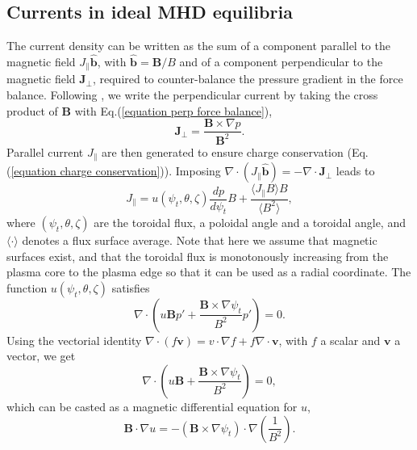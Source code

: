 \documentclass[my_thesis.tex]{subfiles}
\begin{document}
\subsection{Currents in ideal MHD equilibria}\label{sec ideal mhd currents}
The current density can be written as the sum of a component parallel to the magnetic field $J_\parallel \hat{\mathbf{b}}$, with $\hat{\mathbf{b}}=\mathbf{B}/B$ and of a component perpendicular to the magnetic field $\mathbf{J}_\perp$, required to counter-balance the pressure gradient in the force balance. Following \citet{helanderTheoryPlasmaConfinement2014}, we write the perpendicular current by taking the cross product of $\mathbf{B}$ with Eq.(\ref{equation perp force balance}),
\begin{equation}
	\mathbf{J}_\perp = \frac{\mathbf{B}\times\nabla p}{\mathbf{B}^2}.
\end{equation}
Parallel current $J_\parallel$ are then generated to ensure charge conservation (Eq.(\ref{equation charge conservation})). Imposing $\nabla \cdot (J_\parallel\mathbf{\hat{b}}) = - \nabla\cdot\mathbf{J}_\perp$ leads to 
\begin{equation}
	J_\parallel = u(\psi_t,\theta,\zeta)\frac{dp}{d\psi_t}B + \frac{\langle J_\parallel B\rangle B}{\langle B^2\rangle},
\end{equation}
where $(\psi_t,\theta,\zeta)$ are the toroidal flux, a poloidal angle and a toroidal angle, and $\langle\cdot\rangle$ denotes a flux surface average. Note that here we assume that magnetic surfaces exist, and that the toroidal flux is monotonously increasing from the plasma core to the plasma edge so that it can be used as a radial coordinate. The function $u(\psi_t,\theta,\zeta)$ satisfies
\begin{equation}
	\nabla\cdot\left(u\mathbf{B}p'+\frac{\mathbf{B}\times\nabla\psi_t}{B^2}p'\right) = 0.
\end{equation}
Using the vectorial identity $\nabla\cdot(f\mathbf{v})=v\cdot\nabla f+f\nabla\cdot\mathbf{v}$, with $f$ a scalar and $\mathbf{v}$ a vector, we get
\begin{equation}
	\nabla\cdot\left(u\mathbf{B}+\frac{\mathbf{B}\times\nabla\psi_t}{B^2}\right) = 0, \label{eq.div_eq_u}
\end{equation}
which can be casted as a magnetic differential equation for $u$, 
\begin{equation}
	\mathbf{B}\cdot\nabla u = -(\mathbf{B}\times\nabla\psi_t)\cdot\nabla\left(\frac{1}{B^2}\right). \label{eq.diff_u}
\end{equation}
\end{document}
